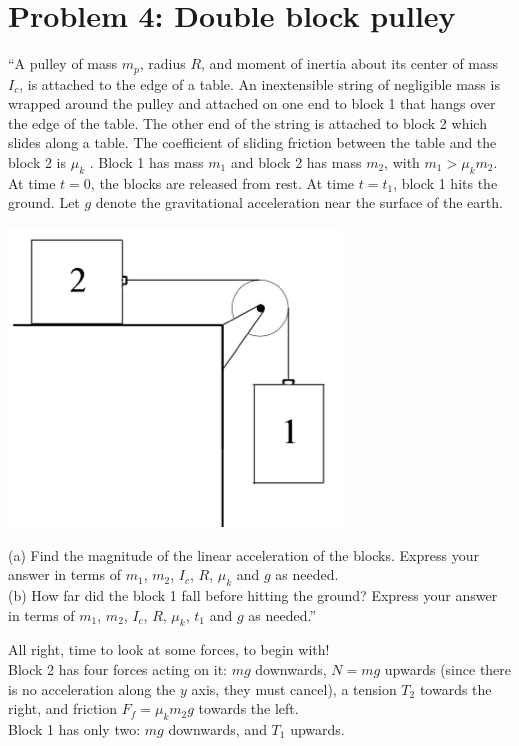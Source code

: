 \documentclass[8.01x]{subfiles}
\begin{document}
\section{Problem 4: Double block pulley}

``A pulley of mass $m_p$, radius $R$, and moment of inertia about its center of mass $I_c$, is attached to the edge of a table. An inextensible string of negligible mass is wrapped around the pulley and attached on one end to block 1 that hangs over the edge of the table. The other end of the string is attached to block 2 which slides along a table. The coefficient of sliding friction between the table and the block 2 is $\mu_k$ . Block 1 has mass $m_1$ and block 2 has mass $m_2$, with $m_1 > \mu_k m_2$. At time $t = 0$, the blocks are released from rest. At time $t = t_1$, block 1 hits the ground. Let $g$ denote the gravitational acceleration near the surface of the earth.

\begin{center}
\includegraphics[scale=1.1]{Graphics/h8p4}
\end{center}

(a) Find the magnitude of the linear acceleration of the blocks. Express your answer in terms of $m_1$, $m_2$, $I_c$, $R$, $\mu_k$ and $g$ as needed.\\
(b) How far did the block 1 fall before hitting the ground? Express your answer in terms of $m_1$, $m_2$, $I_c$, $R$, $\mu_k$, $t_1$ and $g$ as needed.''

All right, time to look at some forces, to begin with!\\

Block 2 has four forces acting on it: $m g$ downwards, $N = m g$ upwards (since there is no acceleration along the $y$ axis, they must cancel), a tension $T_2$ towards the right, and friction $F_f = \mu_k m_2 g$ towards the left.\\
Block 1 has only two: $m g$ downwards, and $T_1$ upwards.
\end{document}
